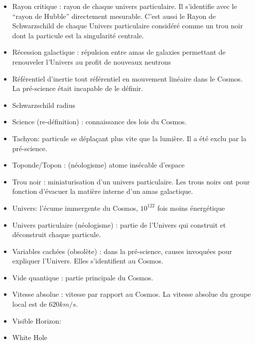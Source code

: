 \documentclass[a4paper,12pt]{article}
\begin{document}
\begin{appendix}
\begin{itemize}
\item Rayon critique : rayon de chaque univers particulaire. Il s’identifie avec le ``rayon de Hubble'' directement mesurable. C’est aussi le Rayon de Schwarzschild de chaque Univers particulaire considéré comme un trou noir dont la particule est la singularité centrale.
\item Récession galactique : répulsion entre amas de galaxies permettant de renouveler l’Univers au profit de nouveaux neutrons
\item Référentiel d’inertie tout référentiel en mouvement linéaire dans le Cosmos. La pré-science était incapable de le définir.
\item Schwarzschild radius
\item Science (re-définition) : connaissance des lois du Cosmos.
\item Tachyon: particule se déplaçant plus vite que la lumière. Il a été exclu par la pré-science.
\item Toponde/Topon : (néologisme) atome insécable d’espace
\item Trou noir : miniaturisation d’un univers particulaire. Les trous noirs ont pour fonction d’évacuer la matière interne d’un amas galactique.
\item Univers: l'écume immergente du Cosmos, $10^{122}$ fois moins énergétique
\item Univers particulaire (néologisme) : partie de l’Univers qui construit et déconstruit chaque particule.
\item Variables cachées (obsolète) : dans la pré-science, causes invoquées pour expliquer l’Univers. Elles s’identifient au Cosmos.
\item Vide quantique : partie principale du Cosmos.
\item Vitesse absolue : vitesse par rapport au Cosmos. La vitesse absolue du groupe local est de $620 km/s$.
\item Visible Horizon:
\item White Hole
\end{itemize}


\listoftables{}   %
\listoffigures{}


\end{appendix}
\end{document}
